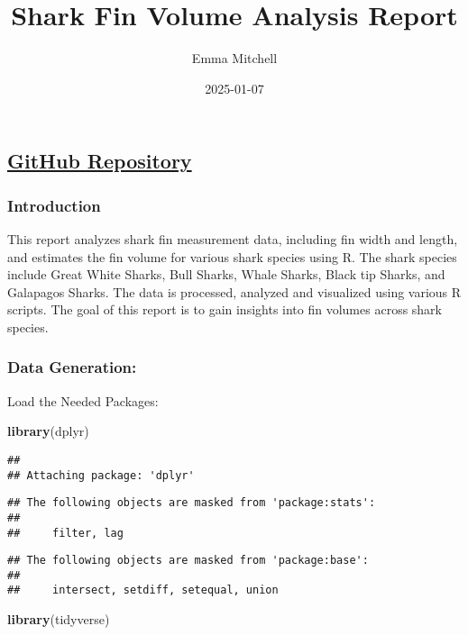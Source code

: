 \documentclass[
]{article}
\title{Shark Fin Volume Analysis Report}
\author{Emma Mitchell}
\date{2025-01-07}
\newenvironment{Shaded}{\begin{snugshade}}{\end{snugshade}}
\newcommand{\FunctionTok}[1]{\textcolor[rgb]{0.13,0.29,0.53}{\textbf{#1}}}
\newcommand{\NormalTok}[1]{#1}
\begin{document}
\maketitle

\subsection{\texorpdfstring{\href{https://github.com/emmaamitchyy/biol432}{GitHub
Repository}}{GitHub Repository}}\label{github-repository}

\subsubsection{Introduction}\label{introduction}

This report analyzes shark fin measurement data, including fin width and
length, and estimates the fin volume for various shark species using R.
The shark species include Great White Sharks, Bull Sharks, Whale Sharks,
Black tip Sharks, and Galapagos Sharks. The data is processed, analyzed
and visualized using various R scripts. The goal of this report is to
gain insights into fin volumes across shark species.

\subsubsection{Data Generation:}\label{data-generation}

Load the Needed Packages:

\begin{Shaded}
\begin{Highlighting}[]
\FunctionTok{library}\NormalTok{(dplyr)}
\end{Highlighting}
\end{Shaded}

\begin{verbatim}
## 
## Attaching package: 'dplyr'
\end{verbatim}

\begin{verbatim}
## The following objects are masked from 'package:stats':
## 
##     filter, lag
\end{verbatim}

\begin{verbatim}
## The following objects are masked from 'package:base':
## 
##     intersect, setdiff, setequal, union
\end{verbatim}

\begin{Shaded}
\begin{Highlighting}[]
\FunctionTok{library}\NormalTok{(tidyverse)}
\end{Highlighting}
\end{Shaded}
\end{document}
